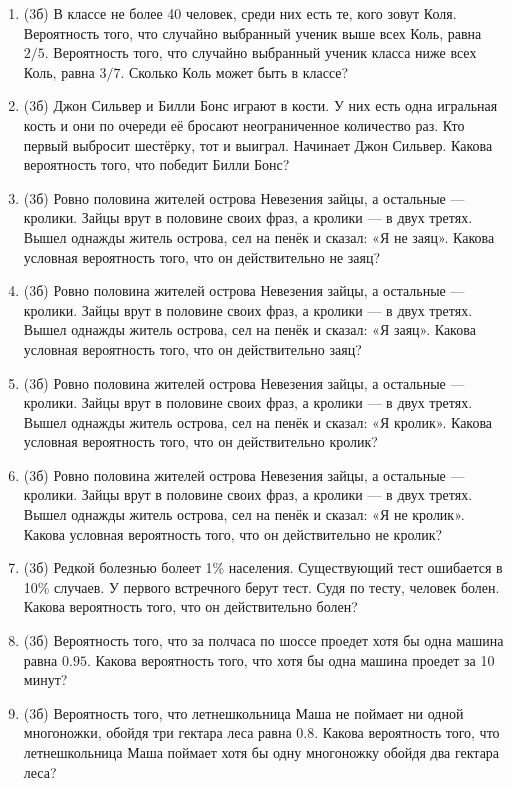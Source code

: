 \documentclass[a4paper, 12pt]{article}
\begin{document}
\newpage
\begin{enumerate}
\item (3б) В классе не более 40 человек, среди них есть те, кого зовут Коля. Вероятность того, что случайно выбранный ученик выше всех Коль, равна $2/5$. Вероятность того, что случайно выбранный ученик класса ниже всех Коль, равна $3/7$. Сколько Коль может быть в классе?
\item (3б) Джон Сильвер и Билли Бонс играют в кости. У них есть одна игральная кость и они по очереди её бросают неограниченное количество раз. Кто первый выбросит шестёрку, тот и выиграл. Начинает Джон Сильвер. Какова вероятность того, что победит Билли Бонс?
\item (3б) Ровно половина жителей острова Невезения зайцы, а остальные — кролики. Зайцы врут в половине своих фраз, а кролики — в двух третях. Вышел однажды житель острова, сел на пенёк и сказал: «Я не заяц». Какова условная вероятность того, что он действительно не заяц?
\item (3б) Ровно половина жителей острова Невезения зайцы, а остальные — кролики. Зайцы врут в половине своих фраз, а кролики — в двух третях. Вышел однажды житель острова, сел на пенёк и сказал: «Я заяц». Какова условная вероятность того, что он действительно заяц?
\item (3б) Ровно половина жителей острова Невезения зайцы, а остальные — кролики. Зайцы врут в половине своих фраз, а кролики — в двух третях. Вышел однажды житель острова, сел на пенёк и сказал: «Я кролик». Какова условная вероятность того, что он действительно кролик?
\item (3б) Ровно половина жителей острова Невезения зайцы, а остальные — кролики. Зайцы врут в половине своих фраз, а кролики — в двух третях. Вышел однажды житель острова, сел на пенёк и сказал: «Я не кролик». Какова условная вероятность того, что он действительно не кролик?
\item (3б) Редкой болезнью болеет 1\% населения. Существующий тест ошибается в 10\% случаев. У первого встречного берут тест. Судя по тесту, человек болен. Какова вероятность того, что он действительно болен?
\item (3б) Вероятность того, что за полчаса по шоссе проедет хотя бы одна машина равна $0.95$. 
Какова вероятность того, что хотя бы одна машина проедет за 10 минут? 
\item (3б) Вероятность того, что летнешкольница Маша не поймает ни одной многоножки, обойдя три гектара леса равна $0.8$. 
Какова вероятность того, что летнешкольница Маша поймает хотя бы одну многоножку обойдя два гектара леса? 



\end{enumerate}
\end{document}
